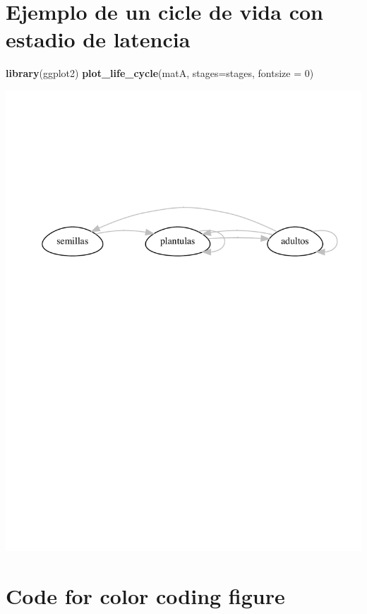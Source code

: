 \documentclass[
]{book}
\newenvironment{Shaded}{\begin{snugshade}}{\end{snugshade}}
\newcommand{\AttributeTok}[1]{\textcolor[rgb]{0.13,0.29,0.53}{#1}}
\newcommand{\DecValTok}[1]{\textcolor[rgb]{0.00,0.00,0.81}{#1}}
\newcommand{\FunctionTok}[1]{\textcolor[rgb]{0.13,0.29,0.53}{\textbf{#1}}}
\newcommand{\NormalTok}[1]{#1}
\theoremstyle{definition}
\theoremstyle{definition}
\theoremstyle{definition}
\theoremstyle{definition}
\theoremstyle{remark}
\begin{document}
\section{Ejemplo de un cicle de vida con estadio de latencia}\label{ejemplo-de-un-cicle-de-vida-con-estadio-de-latencia}

\begin{Shaded}
\begin{Highlighting}[]
\FunctionTok{library}\NormalTok{(ggplot2)}
\FunctionTok{plot\_life\_cycle}\NormalTok{(matA, }\AttributeTok{stages=}\NormalTok{stages, }\AttributeTok{fontsize =} \DecValTok{0}\NormalTok{)}
\end{Highlighting}
\end{Shaded}

\includegraphics{Diagnostico_Poblacional_files/figure-latex/chap2_3-1.pdf}

\section{Code for color coding figure}\label{code-for-color-coding-figure}
\end{document}
